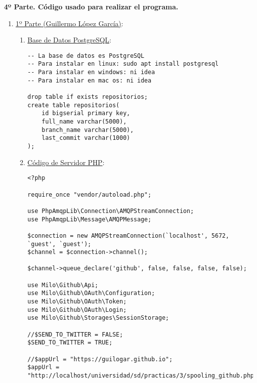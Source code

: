 \documentclass{article}
\begin{document}
\textbf{4º Parte. Código usado para realizar el programa.}
\begin{enumerate}
    \item \underline{1º Parte (Guillermo López García)}:
        \begin{enumerate}
            \item \underline{Base de Datos PostgreSQL}:
                \begin{lstlisting}[frame=single]
-- La base de datos es PostgreSQL
-- Para instalar en linux: sudo apt install postgresql
-- Para instalar en windows: ni idea
-- Para instalar en mac os: ni idea

drop table if exists repositorios;
create table repositorios(
    id bigserial primary key,
    full_name varchar(5000),
    branch_name varchar(5000),
    last_commit varchar(1000)
);
                \end{lstlisting}
            \item \underline{Código de Servidor PHP}:
                \begin{lstlisting}[frame=single]
<?php

require_once "vendor/autoload.php";

use PhpAmqpLib\Connection\AMQPStreamConnection;
use PhpAmqpLib\Message\AMQPMessage;

$connection = new AMQPStreamConnection(`localhost', 5672, `guest', `guest');
$channel = $connection->channel();

$channel->queue_declare('github', false, false, false, false);

use Milo\Github\Api;
use Milo\Github\OAuth\Configuration;
use Milo\Github\OAuth\Token;
use Milo\Github\OAuth\Login;
use Milo\Github\Storages\SessionStorage;

//$SEND_TO_TWITTER = FALSE;
$SEND_TO_TWITTER = TRUE;

//$appUrl = "https://guilogar.github.io";
$appUrl = "http://localhost/universidad/sd/practicas/3/spooling_github.php";


\end{lstlisting}
\end{enumerate}
\end{enumerate}
\end{document}
